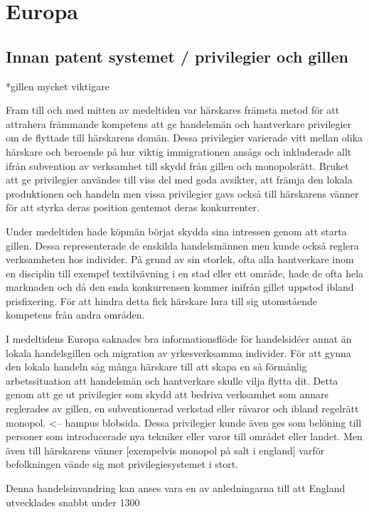 \section{Europa}

\subsection{Innan patent systemet / privilegier och gillen} %
\label{sub:innan_patent_systemet}
*gillen mycket viktigare

Fram till och med mitten av medeltiden var härskares främsta metod för att attrahera främmande kompetens att ge handelsmän och hantverkare privilegier om de flyttade till härskarens domän. Dessa privilegier varierade vitt mellan olika härskare och beroende på hur viktig immigrationen ansågs och inkluderade allt ifrån subvention av verksamhet till skydd från gillen och monopolsrätt. Bruket att ge privilegier användes till viss del med goda avsikter, att främja den lokala produktionen och handeln men vissa privilegier gavs också till härskarens vänner för att styrka deras position gentemot deras konkurrenter.

Under medeltiden hade köpmän börjat skydda sina intressen genom att starta gillen. Dessa representerade de enskilda handelsmännen men kunde också reglera verksamheten hos individer. På grund av sin storlek, ofta alla hantverkare inom en disciplin till exempel textilvävning i en stad eller ett område, hade de ofta hela marknaden och då den enda konkurrensen kommer inifrån gillet uppstod ibland prisfixering. För att hindra detta fick härskare lura till sig utomstående kompetens från andra områden.

I medeltidens Europa saknades bra informationsflöde för handelsidéer annat än lokala handelsgillen och migration av yrkesverksamma individer. För att gynna den lokala handeln såg många härskare till att skapa en så förmånlig arbetssituation att handelsmän och hantverkare skulle vilja flytta dit. Detta genom att ge ut privilegier som skydd att bedriva verksamhet som annars reglerades av gillen, en subventionerad verkstad eller råvaror och ibland regelrätt monopol. <-- hampus blobsida. Dessa privilegier kunde även ges som belöning till personer som introducerade nya tekniker eller varor till området eller landet. Men även till härskarens vänner [exempelvis monopol på salt i england] varför befolkningen vände sig mot privilegiesystemet i stort.

Denna handelsinvandring kan anses vara en av anledningarna till att England utvecklades snabbt under 1300

